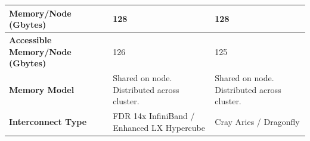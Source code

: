 \documentclass[gmd, manuscript]{copernicus}
\begin{document}
\begin{table}[]
\begin{tabular}{|l|l|l|}
\textbf{Memory/Node (Gbytes)}            & 128                                         & 128                                         \\ \hline
\textbf{Accessible Memory/Node (Gbytes)} & 126                                         & 125                                         \\ \hline
\textbf{Memory Model}                    & Shared on node. Distributed across cluster. & Shared on node. Distributed across cluster. \\ \hline
\textbf{Interconnect Type}               & FDR 14x InfiniBand / Enhanced LX Hypercube  & Cray Aries / Dragonfly                      \\ \hline
\end{tabular}
\end{table}
%
%
%
%
%
%
%
%
%
%
%
%
%
%
\end{document}
